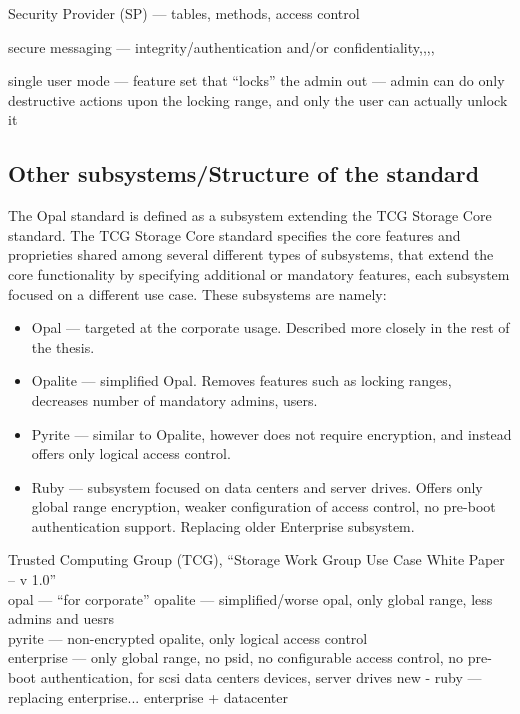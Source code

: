 \documentclass[
  digital, %
  oneside, %
  nolof,     %
  nolot,     %
]{fithesis4}
\begin{document}
\hline

Security Provider (SP) --- tables, methods, access control

secure messaging --- integrity/authentication and/or confidentiality,,,,


single user mode --- feature set that ``locks'' the admin out --- admin can do only destructive actions upon the locking range, and only the user can actually unlock it



\hline

\subsection{Other subsystems/Structure of the standard}

The Opal standard is defined as a subsystem extending the TCG Storage Core standard. The TCG Storage Core standard specifies the core features and proprieties shared among several different types of subsystems, that extend the core functionality by specifying additional or mandatory features, each subsystem focused on a different use case. These subsystems are namely: \begin{itemize}
    \item Opal --- targeted at the corporate usage. Described more closely in the rest of the thesis.
    \item Opalite --- simplified Opal. Removes features such as locking ranges, decreases number of mandatory admins, users.
    \item Pyrite --- similar to Opalite, however does not require encryption, and instead offers only logical access control.
    \item Ruby --- subsystem focused on data centers and server drives. Offers only global range encryption, weaker configuration of access control, no pre-boot authentication support. Replacing older Enterprise subsystem. 
\end{itemize}

\hline

Trusted Computing Group (TCG), “Storage Work Group Use Case White Paper – v 1.0” \\
opal --- ``for corporate''
opalite --- simplified/worse opal, only global range, less admins and uesrs \\
pyrite --- non-encrypted opalite, only logical access control \\
enterprise --- only global range, no psid, no configurable access control, no pre-boot authentication, for scsi data centers devices, server drives
new - ruby --- replacing enterprise... enterprise + datacenter
\end{document}
